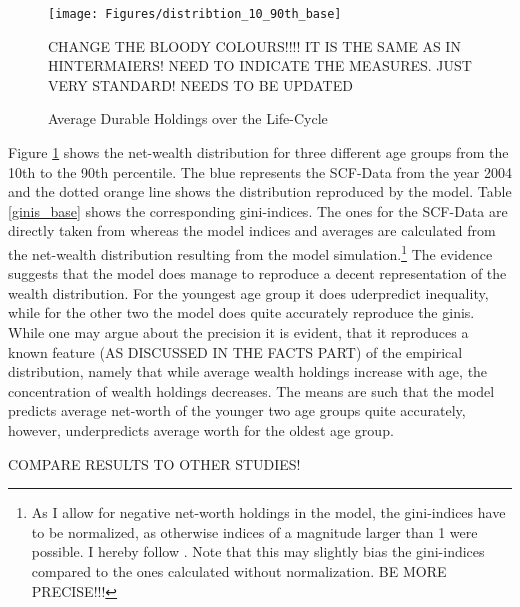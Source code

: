 \documentclass[a4paper,12pt,legno]{article}
\begin{document}
\begin{figure}[!htbp]
\caption{Average Durable Holdings over the Life-Cycle} 
\label{wealth_distr_base}	%
\centering
\texttt{[image: Figures/distribtion\_10\_90th\_base]}  %

\begin{minipage}{0.8\linewidth}
\footnotesize{CHANGE THE BLOODY COLOURS!!!! IT IS THE SAME AS IN HINTERMAIERS! NEED TO INDICATE THE MEASURES. JUST VERY STANDARD! NEEDS TO BE UPDATED}
\end{minipage}

\end{figure}


Figure \ref{wealth_distr_base} shows the net-wealth distribution for three different age groups from the 10th to the 90th percentile. The blue represents the SCF-Data from the year 2004 and the dotted orange line shows the distribution reproduced by the model. 
Table \ref{ginis_base} shows the corresponding gini-indices. The ones for the SCF-Data are directly taken from \cite{hintermaier2011} whereas the model indices and averages are calculated from the net-wealth distribution resulting from the model simulation.\footnote{As I allow for negative net-worth holdings in the model, the gini-indices have to be normalized, as otherwise indices of a magnitude larger than 1 were possible. I hereby follow \cite{chen1982}. Note that this may slightly bias the gini-indices compared to the ones calculated without normalization. BE MORE PRECISE!!!} The evidence suggests that the model does manage to reproduce a decent representation of the wealth distribution. For the youngest age group it does uderpredict inequality, while for the other two the model does quite accurately reproduce the ginis. While one may argue about the precision it is evident, that it reproduces a known feature (AS DISCUSSED IN THE FACTS PART) of the empirical distribution, namely that while average wealth holdings increase with age, the concentration of wealth holdings decreases. 
The means are such that the model predicts average net-worth of the younger two age groups quite accurately, however, underpredicts average worth for the oldest age group. 

COMPARE RESULTS TO OTHER STUDIES! 
\end{document}
